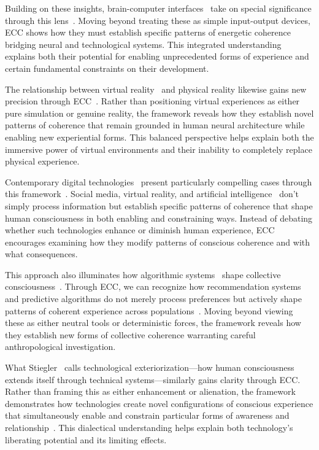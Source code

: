 Building on these insights, brain-computer interfaces~ take on special significance through this lens~\cite{clark2003natural}. Moving beyond treating these as simple input-output devices, ECC shows how they must establish specific patterns of energetic coherence bridging neural and technological systems. This integrated understanding explains both their potential for enabling unprecedented forms of experience and certain fundamental constraints on their development.

The relationship between virtual reality~ and physical reality likewise gains new precision through ECC~\cite{turkle2011alone,kapferer2004ritual}. Rather than positioning virtual experiences as either pure simulation or genuine reality, the framework reveals how they establish novel patterns of coherence that remain grounded in human neural architecture while enabling new experiential forms. This balanced perspective helps explain both the immersive power of virtual environments and their inability to completely replace physical experience.

Contemporary digital technologies~ present particularly compelling cases through this framework~\cite{hayles2012how,pink2016digital}. Social media, virtual reality, and artificial intelligence~ don't simply process information but establish specific patterns of coherence that shape human consciousness in both enabling and constraining ways. Instead of debating whether such technologies enhance or diminish human experience, ECC encourages examining how they modify patterns of conscious coherence and with what consequences.

This approach also illuminates how algorithmic systems~ shape collective consciousness~\cite{noble2018algorithms}. Through ECC, we can recognize how recommendation systems and predictive algorithms do not merely process preferences but actively shape patterns of coherent experience across populations~\cite{boyer2015digital}. Moving beyond viewing these as either neutral tools or deterministic forces, the framework reveals how they establish new forms of collective coherence warranting careful anthropological investigation.

What Stiegler~\cite{stiegler2010taking} calls technological exteriorization—how human consciousness extends itself through technical systems—similarly gains clarity through ECC. Rather than framing this as either enhancement or alienation, the framework demonstrates how technologies create novel configurations of conscious experience that simultaneously enable and constrain particular forms of awareness and relationship~\cite{verbeek2005what}. This dialectical understanding helps explain both technology's liberating potential and its limiting effects.

